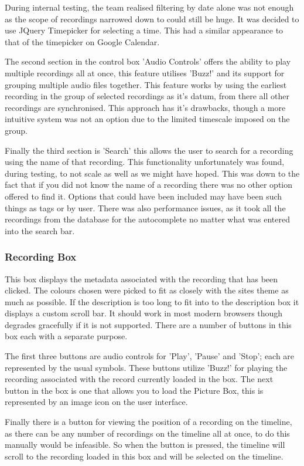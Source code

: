 \documentclass{l3proj}
\begin{document}
During internal testing, the team realised filtering by date alone was not enough as the scope of recordings narrowed down to could still be huge. It was decided to use JQuery Timepicker for selecting a time. This had a similar appearance to that of the timepicker on Google Calendar.

The second section in the control box 'Audio Controls' offers the ability to play multiple recordings all at once, this feature utilises 'Buzz!' and its support for grouping multiple audio files together. This feature works by using the earliest recording in the group of selected recordings as it's datum, from there all other recordings are synchronised. This approach has it's drawbacks, though a more intuitive system was not an option due to the limited timescale imposed on the group.

Finally the third section is 'Search' this allows the user to search for a recording using the name of that recording. This functionality unfortunately was found, during testing, to not scale as well as we might have hoped. This was down to the fact that if you did not know the name of a recording there was no other option offered to find it. Options that could have been included may have been such things as tags or by user. There was also performance issues, as it took all the recordings from the database for the autocomplete no matter what was entered into the search bar.

\subsubsection{Recording Box}

This box displays the metadata associated with the recording that has been clicked. The colours chosen were picked to fit as closely with the sites theme as much as possible. If the description is too long to fit into to the description box it displays a custom  scroll bar. It should work in most modern browsers though degrades gracefully if it is not supported. There are a number of buttons in this box each with a separate purpose.

The first three buttons are audio controls for 'Play', 'Pause' and 'Stop'; each are represented by the usual symbols. These buttons utilize 'Buzz!' for playing the recording associated with the record currently loaded in the box. The next button in the box is one that allows you to load the Picture Box, this is represented by an image icon on the user interface.

Finally there is a button for viewing the position of a recording on the timeline, as there can be any number of recordings on the timeline all at once, to do this manually would be infeasible. So when the button is pressed, the timeline will scroll to the recording loaded in this box and will be selected on the timeline.
\end{document}
